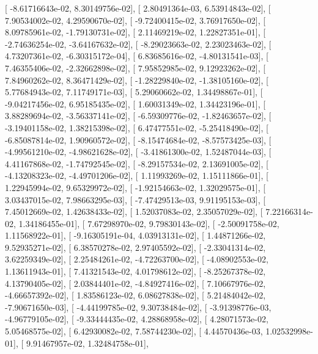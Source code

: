 \documentclass{article}
\begin{document}
       [ -8.61716643e-02,   8.30149756e-02],
       [  2.80491364e-03,   6.53914843e-02],
       [  7.90534002e-02,   4.29590670e-02],
       [ -9.72400415e-02,   3.76917650e-02],
       [  8.09785961e-02,  -1.79130731e-02],
       [  2.11469219e-02,   1.22827351e-01],
       [ -2.74636254e-02,  -3.64167632e-02],
       [ -8.29023663e-02,   2.23023463e-02],
       [  4.73207361e-02,  -6.30315172e-04],
       [  6.83685616e-02,  -4.80131541e-03],
       [  7.46355406e-02,  -2.32662898e-02],
       [  7.95852985e-02,   9.12923262e-02],
       [  7.84960262e-02,   8.36471429e-02],
       [ -1.28229840e-02,  -1.38105160e-02],
       [  5.77684943e-02,   7.11749171e-03],
       [  5.29060662e-02,   1.34498867e-01],
       [ -9.04217456e-02,   6.95185435e-02],
       [  1.60031349e-02,   1.34423196e-01],
       [  3.88289694e-02,  -3.56337141e-02],
       [ -6.59309776e-02,  -1.82463657e-02],
       [ -3.19401158e-02,   1.38215398e-02],
       [  6.47477551e-02,  -5.25418490e-02],
       [ -6.85087814e-02,   1.90960572e-02],
       [ -8.15474684e-02,  -8.57573425e-03],
       [ -4.99561210e-02,  -4.98621628e-02],
       [ -3.41861300e-02,   1.52487044e-03],
       [  4.41167868e-02,  -1.74792545e-02],
       [ -8.29157534e-02,   2.13691005e-02],
       [ -4.13208323e-02,  -4.49701206e-02],
       [  1.11993269e-02,   1.15111866e-01],
       [  1.22945994e-02,   9.65329972e-02],
       [ -1.92154663e-02,   1.32029575e-01],
       [  3.03437015e-02,   7.98663295e-03],
       [ -7.47429513e-03,   9.91195153e-03],
       [  7.45012669e-02,   1.42638433e-02],
       [  1.52037083e-02,   2.35057029e-02],
       [  7.22166314e-02,   1.34186455e-01],
       [  7.67298970e-02,   9.79830143e-02],
       [ -2.50091758e-02,   1.11568922e-01],
       [ -9.16305191e-04,   4.03913131e-02],
       [  1.44871266e-02,   9.52935271e-02],
       [  6.38570278e-02,   2.97405592e-02],
       [ -2.33041314e-02,   3.62259349e-02],
       [  2.25484261e-02,  -4.72263700e-02],
       [ -4.08902553e-02,   1.13611943e-01],
       [  7.41321543e-02,   4.01798612e-02],
       [ -8.25267378e-02,   4.13790405e-02],
       [  2.03844401e-02,  -4.84927416e-02],
       [  7.10667976e-02,  -4.66657392e-02],
       [  1.83586123e-02,   6.08627838e-02],
       [  5.21484042e-02,  -7.90671650e-03],
       [ -4.44199785e-02,   9.30738484e-02],
       [ -3.91398776e-03,  -4.96779105e-02],
       [ -9.33444435e-02,   4.28868958e-02],
       [  4.28071573e-02,   5.05468575e-02],
       [  6.42930082e-02,   7.58744230e-02],
       [  4.44570436e-03,   1.02532998e-01],
       [  9.91467957e-02,   1.32484758e-01],
\end{document}

